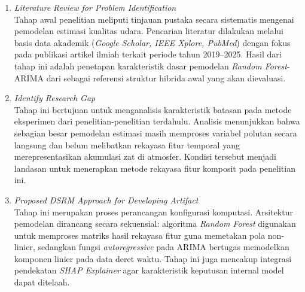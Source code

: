 \begin{enumerate}

\item {\textit{Literature Review for Problem Identification}}\\
Tahap awal penelitian meliputi tinjauan pustaka secara sistematis mengenai pemodelan estimasi kualitas udara. Pencarian literatur dilakukan melalui basis data akademik (\textit{Google Scholar, IEEE Xplore, PubMed}) dengan fokus pada publikasi artikel ilmiah terkait periode tahun 2019--2025. Hasil dari tahap ini adalah penetapan karakteristik dasar pemodelan \textit{Random Forest}-ARIMA dari \textcite{yenkikar2025explainable} sebagai referensi struktur hibrida awal yang akan dievaluasi.

\item {\textit{Identify Research Gap}}\\
Tahap ini bertujuan untuk menganalisis karakteristik batasan pada metode eksperimen dari penelitian-penelitian terdahulu. Analisis menunjukkan bahwa sebagian besar pemodelan estimasi masih memproses variabel polutan secara langsung dan belum melibatkan rekayasa fitur temporal yang merepresentasikan akumulasi zat di atmosfer. Kondisi tersebut menjadi landasan untuk menerapkan metode rekayasa fitur komposit pada penelitian ini.

\item {\textit{Proposed DSRM Approach for Developing Artifact}}\\
Tahap ini merupakan proses perancangan konfigurasi komputasi. Arsitektur pemodelan dirancang secara sekuensial: algoritma \textit{Random Forest} digunakan untuk memproses matriks hasil rekayasa fitur guna memetakan pola non-linier, sedangkan fungsi \textit{autoregressive} pada ARIMA bertugas memodelkan komponen linier pada data deret waktu. Tahap ini juga mencakup integrasi pendekatan \textit{SHAP Explainer} agar karakteristik keputusan internal model dapat ditelaah.


\end{enumerate}
